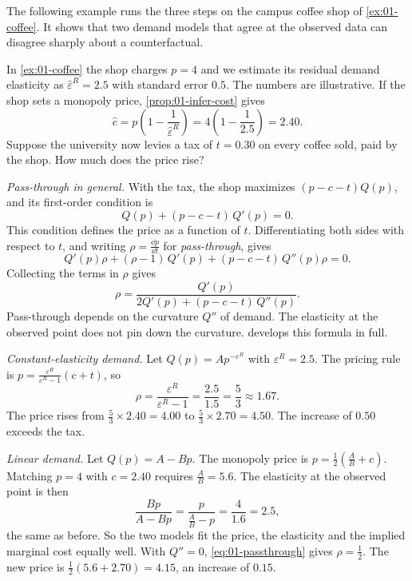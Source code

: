 The following example runs the three steps on the campus coffee shop of \cref{ex:01-coffee}. It shows that
two demand models that agree at the observed data can disagree sharply about a counterfactual.

\begin{example}\label{ex:01-coffee-tax}
In \cref{ex:01-coffee} the shop charges $p = 4$ and we estimate its residual demand elasticity as
$\hat\varepsilon^R = 2.5$ with standard error $0.5$. The numbers are illustrative. If the shop sets a
monopoly price, \cref{prop:01-infer-cost} gives
\[
  \hat c = p\left(1 - \frac{1}{\hat\varepsilon^R}\right) = 4\left(1 - \frac{1}{2.5}\right) = 2.40 .
\]
Suppose the university now levies a tax of $t = 0.30$ on every coffee sold, paid by the shop. How much does
the price rise?

\emph{Pass-through in general.} With the tax, the shop maximizes $(p - c - t)Q(p)$, and its first-order
condition is
\[
  Q(p) + (p - c - t)\,Q'(p) = 0 .
\]
This condition defines the price as a function of $t$. Differentiating both sides with respect to $t$, and
writing $\rho = \frac{\dd p}{\dd t}$ for \emph{pass-through}, gives
\[
  Q'(p)\rho + (\rho - 1)\,Q'(p) + (p - c - t)\,Q''(p)\rho = 0 .
\]
Collecting the terms in $\rho$ gives
\begin{equation}\label{eq:01-passthrough}
  \rho = \frac{Q'(p)}{2Q'(p) + (p - c - t)\,Q''(p)} .
\end{equation}
Pass-through depends on the curvature $Q''$ of demand. The elasticity at the observed point does not pin
down the curvature.  develops this formula in full.

\emph{Constant-elasticity demand.} Let $Q(p) = A p^{-\varepsilon^R}$ with $\varepsilon^R = 2.5$. The pricing
rule is $p = \frac{\varepsilon^R}{\varepsilon^R - 1}(c + t)$, so
\[
  \rho = \frac{\varepsilon^R}{\varepsilon^R - 1} = \frac{2.5}{1.5} = \frac{5}{3} \approx 1.67 .
\]
The price rises from $\frac{5}{3} \times 2.40 = 4.00$ to $\frac{5}{3} \times 2.70 = 4.50$. The increase of
$0.50$ exceeds the tax.

\emph{Linear demand.} Let $Q(p) = A - Bp$. The monopoly price is $p = \frac{1}{2}\left(\frac{A}{B} + c\right)$.
Matching $p = 4$ with $c = 2.40$ requires $\frac{A}{B} = 5.6$. The elasticity at the observed point is then
\[
  \frac{Bp}{A - Bp} = \frac{p}{\frac{A}{B} - p} = \frac{4}{1.6} = 2.5 ,
\]
the same as before. So the two models fit the price, the elasticity and the implied marginal cost equally
well. With $Q'' = 0$, \eqref{eq:01-passthrough} gives $\rho = \frac{1}{2}$. The new price is
$\frac{1}{2}(5.6 + 2.70) = 4.15$, an increase of $0.15$.


\end{example}
